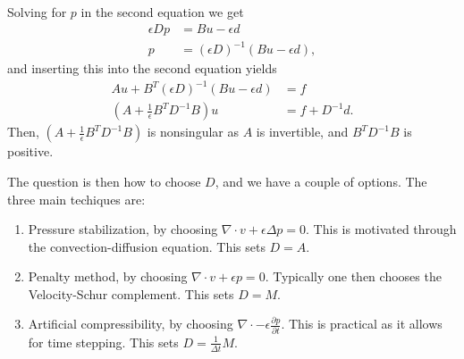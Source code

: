 Solving for $p$ in the second equation we get
\begin{equation}
    \begin{split}
        \epsilon D p &= Bu - \epsilon d \\
        p &= (\epsilon D)^{-1} (Bu - \epsilon d),
    \end{split}
\end{equation}
and inserting this into the second equation yields
\begin{equation}
    \begin{split}
        Au + B^T (\epsilon D)^{-1} (Bu - \epsilon d) &= f \\
        \left( A + \frac{1}{\epsilon} B^T D^{-1} B \right) u &= f + D^{-1} d.
    \end{split}
\end{equation}
Then, $\left( A + \frac{1}{\epsilon} B^T D^{-1} B \right)$ is nonsingular as $A$ is invertible, and $B^T D^{-1} B$ is positive.

The question is then how to choose $D$, and we have a couple of options.
The three main techiques are:
\begin{enumerate}
    \item
        Pressure stabilization, by choosing $\nabla \cdot v + \epsilon \Delta p = 0$.
        This is motivated through the convection-diffusion equation.
        This sets $D = A$.

    \item
        Penalty method, by choosing $\nabla \cdot v + \epsilon p = 0$.
        Typically one then chooses the Velocity-Schur complement.
        This sets $D = M$.

    \item
        Artificial compressibility, by choosing $\nabla \cdot -\epsilon \frac{\partial p}{\partial t}$.
        This is practical as it allows for time stepping.
        This sets $D = \frac{1}{\Delta t} M$.
\end{enumerate}